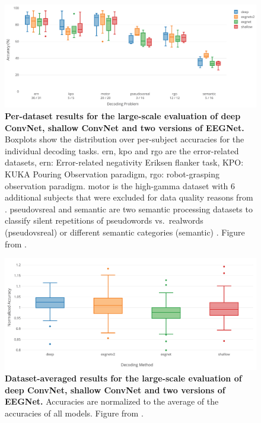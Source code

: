 \begin{figure}[htb]
    \myfloatalign
    \includegraphics[width=1\linewidth]{images/large-framework-per-dataset-results.png}
    \caption[Large-scale evaluation results]{
\textbf{Per-dataset results for the large-scale evaluation of deep
ConvNet, shallow ConvNet and two versions of EEGNet.} Boxplots show the
distribution over per-subject accuracies for the individual decoding
tasks. ern, kpo and rgo are the error-related datasets, ern:
Error-related negativity Eriksen flanker task, KPO: KUKA Pouring
Observation paradigm, rgo: robot-grasping observation paradigm. motor is
the high-gamma dataset with 6 additional subjects that were excluded for
data quality reasons from \cite{schirrmeisterdeephbm2017}.
pseudovsreal and semantic are two semantic processing datasets to
classify silent repetitions of pseudowords vs.~realwords (pseudovsreal)
or different semantic categories (semantic) . Figure from
\citet{heilmeyer2018large}.
}
\label{large-framework-per-dataset-results-fig}
\end{figure}


\begin{figure}[htb]
    \myfloatalign
    \includegraphics[width=1\linewidth]{images/large-framework-averaged-results.png}
    \caption[Large-scale dataset-averaged evaluation results]{
\textbf{Dataset-averaged results for the large-scale evaluation of deep
ConvNet, shallow ConvNet and two versions of EEGNet.} Accuracies are
normalized to the average of the accuracies of all models. Figure from
\citet{heilmeyer2018large}.
}
\label{large-framework-averaged-results-fig}
\end{figure}


